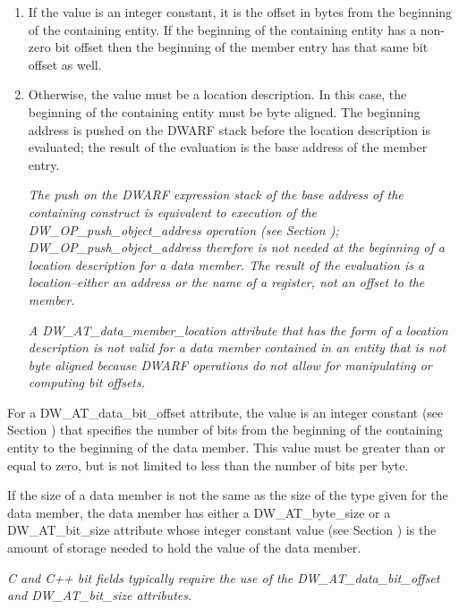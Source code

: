 \begin{enumerate}[1.]

\item If the value is an integer constant, it is the offset
in bytes from the beginning of the containing entity. If
the beginning of the containing entity has a non-zero bit
offset then the beginning of the member entry has that same
bit offset as well.

\item Otherwise, the value must be a location description. In
this case, the beginning of the containing entity must be byte
aligned. The beginning address is pushed on the DWARF stack
before the location description is evaluated; the result of
the evaluation is the base address of the member entry.

\textit{The push on the DWARF expression stack of the base address of
the containing construct is equivalent to execution of the
DW\_OP\_push\_object\_address operation 
(see Section );
DW\_OP\_push\_object\_address therefore is not needed at the
beginning of a location description for a data member. The
result of the evaluation is a location--either an address or
the name of a register, not an offset to the member.}

\textit{A DW\_AT\_data\_member\_location attribute that has the form of a
location description is not valid for a data member contained
in an entity that is not byte aligned because DWARF operations
do not allow for manipulating or computing bit offsets.}

\end{enumerate}

For a DW\_AT\_data\_bit\_offset attribute, the value is an integer
constant 
(see Section ) 
that specifies the number of bits
from the beginning of the containing entity to the beginning
of the data member. This value must be greater than or equal
to zero, but is not limited to less than the number of bits
per byte.

If the size of a data member is not the same as the size
of the type given for the data member, the data member has
either a DW\_AT\_byte\_size or a DW\_AT\_bit\_size attribute whose
integer constant value 
(see Section ) 
is the amount
of storage needed to hold the value of the data member.

\textit{C and C++ bit fields typically require the use of the
DW\_AT\_data\_bit\_offset and DW\_AT\_bit\_size attributes.}

